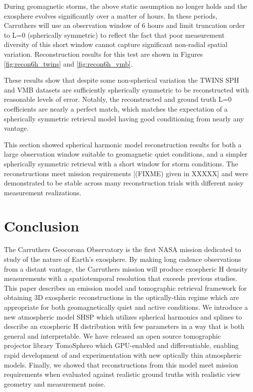 \documentclass[pdflatex,twocolumn,sn-mathphys-num]{sn-jnl}
\begin{document}
  During geomagnetic storms, the above static assumption no longer holds and the exosphere evolves significantly over a matter of hours.  In these periods, Carruthers will use an observation window of 6 hours and limit truncation order to L=0 (spherically symmetric) to reflect the fact that poor measurement diversity of this short window cannot capture significant non-radial spatial variation.  Reconstruction results for this test are shown in Figures \ref{fig:recon6h_twins} and \ref{fig:recon6h_vmb}.

  These results show that despite some non-spherical variation the TWINS SPH and VMB datasets are sufficiently spherically symmetric to be reconstructed with reasonable levels of error.  Notably, the reconstructed and ground truth L=0 coefficients are nearly a perfect match, which matches the expectation of a spherically symmetric retrieval model having good conditioning from nearly any vantage.

  This section showed spherical harmonic model reconstruction results for both a large observation window suitable to geomagnetic quiet conditions, and a simpler spherically symmetric retrieval with a short window for storm conditions.  The reconstructions meet mission requirements [(FIXME) given in XXXXX] and were demonstrated to be stable across many reconstruction trials with different noisy measurement realizations.


\section{Conclusion}

The Carruthers Geocorona Observatory is the first NASA mission dedicated to study of the nature of Earth's exosphere.  By making long cadence observations from a distant vantage, the Carruthers mission will produce exospheric H density measurements with a spatiotemporal resolution that exceeds previous studies.  This paper describes an emission model and tomographic retrieval framework for obtaining 3D exospheric reconstructions in the optically-thin regime which are appropriate for both geomagnetically quiet and active conditions.  We introduce a new atmospheric model SHSP which utilizes spherical harmonics and splines to describe an exospheric H distribution with few parameters in a way that is both general and interpretable.  We have released an open source tomographic projector library TomoSphero which GPU-enabled and differentiable, enabling rapid development of and experimentation with new optically thin atmospheric models. Finally, we showed that reconstructions from this model meet mission requirements when evaluated against realistic ground truths with realistic view geometry and measurement noise.
\end{document}
